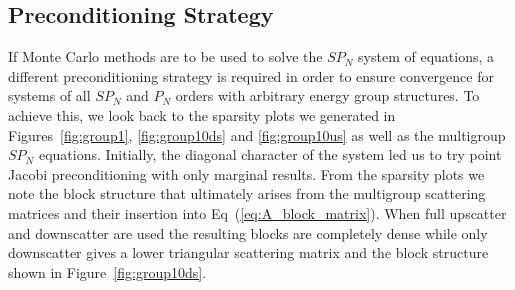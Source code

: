 \subsection{Preconditioning Strategy}
\label{subsec:spn_preconditioning}
If Monte Carlo methods are to be used to solve the $SP_N$ system of
equations, a different preconditioning strategy is required in order
to ensure convergence for systems of all $SP_N$ and $P_N$ orders with
arbitrary energy group structures. To achieve this, we look back to
the sparsity plots we generated in Figures~\ref{fig:group1},
\ref{fig:group10ds} and \ref{fig:group10us} as well as the multigroup
$SP_N$ equations. Initially, the diagonal character of the system led
us to try point Jacobi preconditioning with only marginal
results. From the sparsity plots we note the block structure that
ultimately arises from the multigroup scattering matrices and their
insertion into Eq~(\ref{eq:A_block_matrix}). When full upscatter and
downscatter are used the resulting blocks are completely dense while
only downscatter gives a lower triangular scattering matrix and the
block structure shown in Figure~\ref{fig:group10ds}. 

